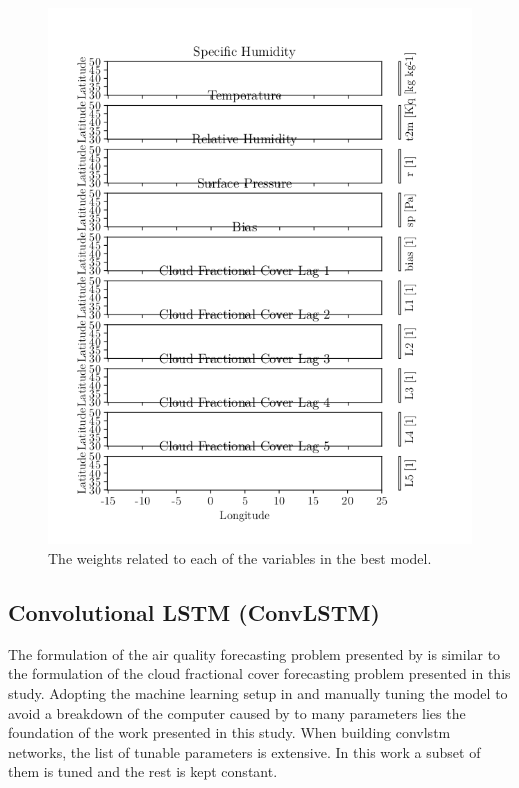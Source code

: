 \begin{figure}
    \centering
    \includegraphics{python_figs/weights_AR-B-L5_best_ar_model.png}
    \caption{The weights related to each of the variables in the best model.}
    \label{tab:weights_best_model}
\end{figure}


\clearpage

\subsection{Convolutional LSTM (ConvLSTM)}
The formulation of the air quality forecasting problem presented by \citeauthor{SunAirLSTM} is similar to the formulation of the cloud fractional cover forecasting problem presented in this study. 
Adopting the machine learning setup in  and manually tuning the model to avoid a breakdown of the computer caused by to many parameters lies the foundation of the work presented in this study. When building \acrshort{convlstm} networks, the list of tunable parameters is extensive. In this work a subset of them is tuned and the rest is kept constant.

